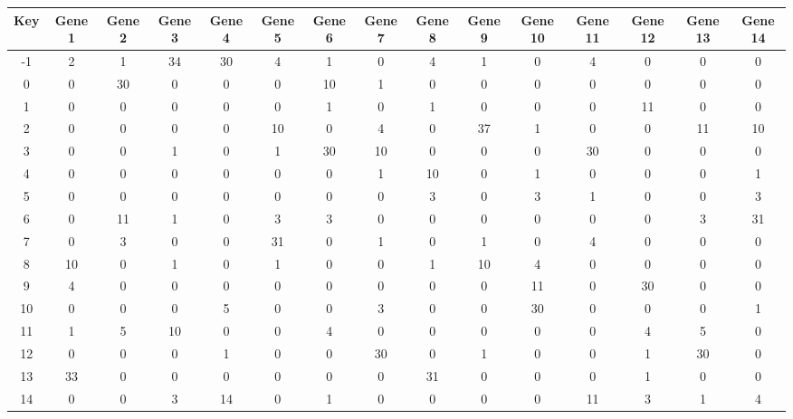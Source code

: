 \begin{tabular}{|c|c|c|c|c|c|c|c|c|c|c|c|c|c|c|}
\hline
Key & Gene 1 & Gene 2 & Gene 3 & Gene 4 & Gene 5 & Gene 6 & Gene 7 & Gene 8 & Gene 9 & Gene 10 & Gene 11 & Gene 12 & Gene 13 & Gene 14 \\
\hline
-1 & 2 & 1 & 34 & 30 & 4 & 1 & 0 & 4 & 1 & 0 & 4 & 0 & 0 & 0 \\
0 & 0 & 30 & 0 & 0 & 0 & 10 & 1 & 0 & 0 & 0 & 0 & 0 & 0 & 0 \\
1 & 0 & 0 & 0 & 0 & 0 & 1 & 0 & 1 & 0 & 0 & 0 & 11 & 0 & 0 \\
2 & 0 & 0 & 0 & 0 & 10 & 0 & 4 & 0 & 37 & 1 & 0 & 0 & 11 & 10 \\
3 & 0 & 0 & 1 & 0 & 1 & 30 & 10 & 0 & 0 & 0 & 30 & 0 & 0 & 0 \\
4 & 0 & 0 & 0 & 0 & 0 & 0 & 1 & 10 & 0 & 1 & 0 & 0 & 0 & 1 \\
5 & 0 & 0 & 0 & 0 & 0 & 0 & 0 & 3 & 0 & 3 & 1 & 0 & 0 & 3 \\
6 & 0 & 11 & 1 & 0 & 3 & 3 & 0 & 0 & 0 & 0 & 0 & 0 & 3 & 31 \\
7 & 0 & 3 & 0 & 0 & 31 & 0 & 1 & 0 & 1 & 0 & 4 & 0 & 0 & 0 \\
8 & 10 & 0 & 1 & 0 & 1 & 0 & 0 & 1 & 10 & 4 & 0 & 0 & 0 & 0 \\
9 & 4 & 0 & 0 & 0 & 0 & 0 & 0 & 0 & 0 & 11 & 0 & 30 & 0 & 0 \\
10 & 0 & 0 & 0 & 5 & 0 & 0 & 3 & 0 & 0 & 30 & 0 & 0 & 0 & 1 \\
11 & 1 & 5 & 10 & 0 & 0 & 4 & 0 & 0 & 0 & 0 & 0 & 4 & 5 & 0 \\
12 & 0 & 0 & 0 & 1 & 0 & 0 & 30 & 0 & 1 & 0 & 0 & 1 & 30 & 0 \\
13 & 33 & 0 & 0 & 0 & 0 & 0 & 0 & 31 & 0 & 0 & 0 & 1 & 0 & 0 \\
14 & 0 & 0 & 3 & 14 & 0 & 1 & 0 & 0 & 0 & 0 & 11 & 3 & 1 & 4 \\
\hline
\end{tabular}